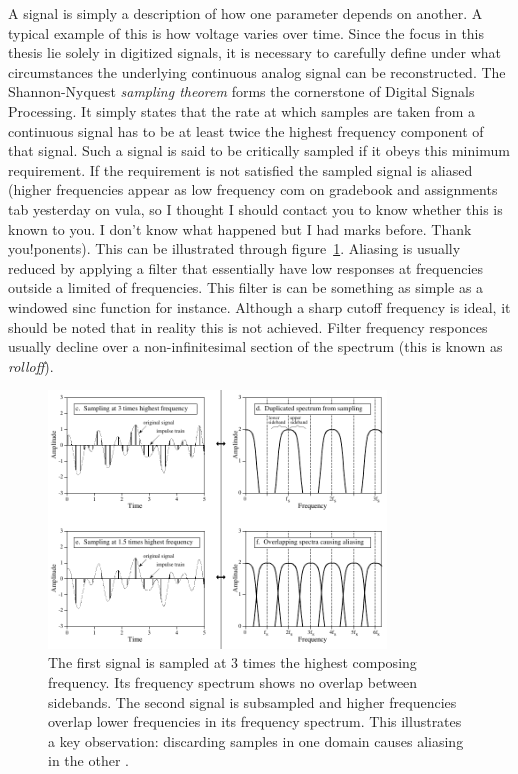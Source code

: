A signal is simply a description of how one parameter depends on another. A typical example of this is how voltage varies over time. Since the focus in this thesis lie solely in digitized signals, it is necessary to carefully
define under what circumstances the underlying continuous analog signal can be reconstructed. The Shannon-Nyquest \textit{sampling theorem} forms the cornerstone of Digital Signals Processing. It simply states that the rate at
which samples are taken from a continuous signal has to be at least twice the highest frequency component of that signal. Such a signal is said to be critically sampled if it obeys this minimum requirement. If the requirement is
not satisfied the sampled signal is aliased (higher frequencies appear as low frequency com on gradebook and assignments tab yesterday on vula, so I thought I should contact you to know whether this is known to you. I don't know what happened but I had marks before. Thank you!ponents). This can be illustrated through figure~\ref{fig_invalid_sampling}. Aliasing is usually reduced by applying a filter that essentially
have low responses at frequencies outside a limited  of frequencies. This filter is can be something as simple as a windowed sinc function for instance. Although a sharp cutoff frequency is ideal, it should be noted 
that in reality this is not achieved. Filter frequency responces usually decline over a non-infinitesimal section of the spectrum (this is known as \textit{rolloff}).

\begin{figure}[ht]
 \begin{mdframed}
 \centering
 \includegraphics[width=0.8\textwidth]{images/improper_sampling.png}
 \caption[Aliasing]{The first signal is sampled at 3 times the highest composing frequency. Its frequency spectrum shows no overlap between sidebands. The second signal is subsampled and higher frequencies overlap lower frequencies
 in its frequency spectrum. This illustrates a key observation: discarding samples in one domain causes aliasing in the other \cite{smith1997scientist}.}
 \label{fig_invalid_sampling}
 \end{mdframed}
\end{figure}

